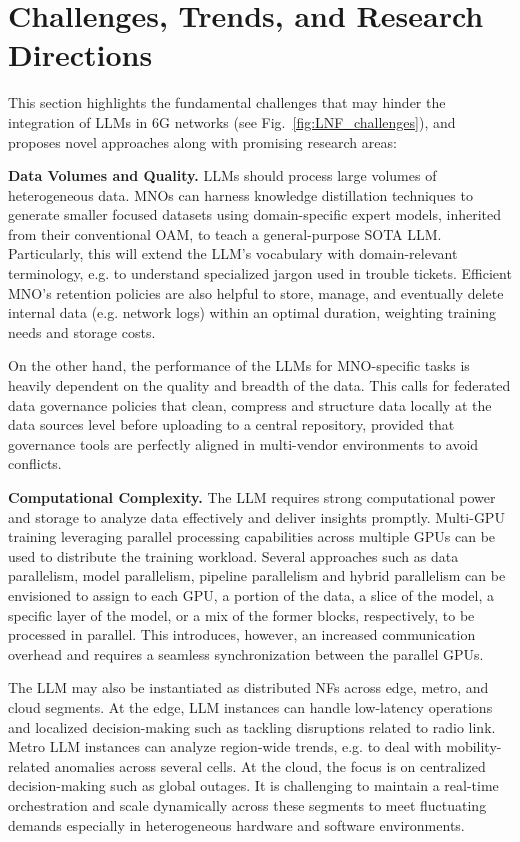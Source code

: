 \section{Challenges, Trends, and Research Directions}
\label{sec:Challenges_and_future_outlook}
This section highlights the fundamental
challenges that may hinder the integration of \glspl{LLM} in 6G networks (see Fig.~\ref{fig:LNF_challenges}), and proposes novel approaches along with promising research areas:
\smallskip

\textbf{Data Volumes and Quality.} \glspl{LLM} should process large volumes of heterogeneous data. \glspl{MNO} can harness knowledge distillation techniques \cite{Acharya2024Survey} to generate smaller focused datasets using domain-specific expert models, inherited from their conventional \gls{OAM}, to teach a general-purpose \gls{SOTA} \gls{LLM}. Particularly, this will extend the \gls{LLM}'s vocabulary with domain-relevant terminology, e.g. to understand specialized jargon used in trouble tickets. Efficient \gls{MNO}'s retention policies are also helpful to store, manage, and eventually delete internal data (e.g. network logs) within an optimal duration, weighting training needs and storage costs.

On the other hand, the performance of the \glspl{LLM} for \gls{MNO}-specific tasks is heavily dependent on the quality and breadth of the data. This calls for federated data governance policies that clean, compress and structure data locally at the data sources level before uploading to a central repository, provided that governance tools are perfectly aligned in multi-vendor environments to avoid conflicts.
\smallskip

\textbf{Computational Complexity.} The \gls{LLM} requires strong computational power and storage to analyze data effectively and deliver insights promptly. Multi-\gls{GPU} training leveraging parallel processing capabilities across multiple \glspl{GPU} can be used to distribute the training workload. Several approaches such as data parallelism, model parallelism, pipeline parallelism and hybrid parallelism can be envisioned to assign to each \gls{GPU}, a portion of the data, a slice of the model, a specific layer of the model, or a mix of the former blocks, respectively, to be processed in parallel. This introduces, however, an increased communication overhead and requires a seamless synchronization between the parallel \glspl{GPU}.

The \gls{LLM} may also be instantiated as distributed \glspl{NF} across edge, metro, and cloud segments. At the edge, \gls{LLM} instances can handle low-latency operations and localized decision-making such as tackling disruptions related to radio link. Metro \gls{LLM} instances can analyze region-wide trends, e.g. to deal with mobility-related anomalies across several cells. At the cloud, the focus is on centralized decision-making \cite{Chaparadza2023optimization} such as global outages. It is challenging to maintain a real-time orchestration and scale dynamically across these segments to meet fluctuating demands especially in heterogeneous hardware and software environments.%

